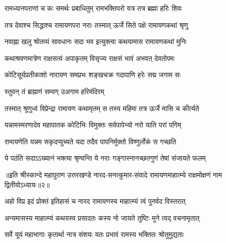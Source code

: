\twolineshloka
{रामध्यानपराणां च कः समर्थः प्रबाधितुम्}
{रामभक्तिपरो यत्र तत्र ब्रह्मा हरिः शिवः}%

 

\twolineshloka
{तत्र देवाश्च सिद्धाश्च रामायणपरा नराः}
{तस्मात् ऊर्जे सिते पक्षे रामायणकथां श्रृणु}%

 

\twolineshloka
{नवाह्ना खलु श्रोतव्यं सावधानः सदा भव}
{इत्युक्त्वा कथयामास रामायणकथां मुनिः}%

 

\twolineshloka
{कथाश्रवणमात्रेण राक्षसत्वं अपाकृतम्}
{विसृज्य राक्षसं भावं अभवत् देवतोपमः}%

 

\twolineshloka
{कोटिसूर्यप्रतीकाशो नारायण समप्रभः}
{शङ्‍खचक्र गदापाणि हरेः सद्म जगाम सः}%

 
\onelineshloka
{स्तुवन् तं ब्राह्मणं सम्यग् उअगाम हरिमंदिरम्}%

 


\twolineshloka
{तस्मात् श्रूणुध्वं विप्रेन्द्रा रामायण कथामृतम्}
{स तस्य महिमा तत्र ऊर्जे मासि च कीर्त्यते}%

 

\twolineshloka
{यन्नामस्मरणादेव महापातक कोटिभिः}
{विमुक्तः सर्वपापेभ्यो नरो याति परां पगिम्}%

 

\twolineshloka
{रामायणेति यन्नम सकृदप्युच्यते यदा}
{तदैव पापनिर्मुक्तो विष्णुर्लोकं स गच्छति}%

 

\twolineshloka
{ये पठंति सदाऽऽख्यानं भक्त्या श्रृण्वन्ति ये नराः}
{गङ्‍गास्नानच्छतगुणं तेषां संजायते फलम्}%

 

॥इति श्रीस्कान्दे महापुराण उत्तरखण्डे नारद-सनत्कुमार-संवादे रामायणमाहात्म्ये राक्षमोक्षणं नाम द्वितीयोऽध्यायः॥२॥
 

 


\twolineshloka
{अहो विप्र इदं प्रोक्तं इतिहासं च नारद}
{रामायणस्य माहात्म्यं त्वं पुनर्वद विस्तरात्}%

 

\twolineshloka
{अन्यमासस्य माहात्म्यं कथयस्व प्रसादतः}
{कस्य नो जायते तुष्टिः मुने त्वद् वचनामृतात्}%

 


\twolineshloka
{सर्वे यूयं महाभागाः कृतार्था नात्र संशयः}
{यतः प्रभावं रामस्य भक्तितः श्रोतुमुद्यताः}%

